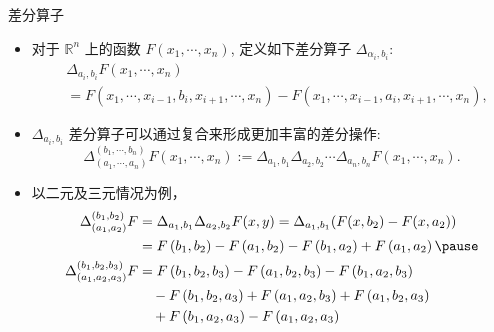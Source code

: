 \documentclass[Prob-All.tex]{subfiles}
\begin{document}
\begin{frame}{差分算子}
\begin{itemize}[<+-|alert@+>]
\item 对于 $\mathbb{R}^{n}$ 上的函数 $F(x_1,\cdots,x_n)$, 定义如下差分算子 $\Delta_{\alpha_{i}, b_{i}}$:
\begin{align*}
   &\Delta_{a_{i}, b_{i}}F(x_{1}, \cdots, x_{n})\\
   &=F\left(x_{1}, \cdots, x_{i-1}, b_{i}, x_{i+1}, \cdots, x_{n}\right)-F\left(x_{1}, \cdots, x_{i-1}, a_{i}, x_{i+1}, \cdots, x_{n}\right),
\end{align*}

\item $\Delta_{a_{i}, b_{i}}$ 差分算子可以通过复合来形成更加丰富的差分操作:
\[
\Delta_{\left(a_{1}, \cdots, a_{n}\right)}^{\left(b_{1}, \cdots, b_{n}\right)}F\left(x_{1}, \cdots, x_{n}\right) :=\Delta_{a_{1}, b_{1}} \Delta_{a_{2}, b_{2}} \cdots \Delta_{a_{n}, b_{n}} F\left(x_{1}, \cdots, x_{n}\right).
\]
\item
以二元及三元情况为例，
\begin{align*}
	\Delta_{\left(a_{1}, a_{2}\right)}^{\left(b_{1}, b_{2}\right)} F&= \Delta_{a_{1}, b_{1}} \Delta_{a_{2}, b_{2}} F(x,y)=\Delta_{a_{1}, b_{1}} (F(x, b_2)-F(x,a_2)) \\
	&=F\left(b_{1}, b_{2}\right)-F\left(a_{1}, b_{2}\right)-F\left(b_{1}, a_{2}\right)+F\left(a_{1}, a_{2}\right) \pause \\
	\Delta_{\left(a_{1}, a_{2}, a_{3}\right)}^{\left(b_{1}, b_{2}, b_{3}\right)} F&= F\left(b_{1}, b_{2}, b_{3}\right)-F\left(a_{1}, b_{2}, b_{3}\right)-F\left(b_{1}, a_{2}, b_{3}\right)\\
	&\quad -F\left(b_{1}, b_{2}, a_{3}\right) +F\left(a_{1}, a_{2}, b_{3}\right)+F\left(a_{1}, b_{2}, a_{3}\right)\\
	&\quad +F\left(b_{1}, a_{2}, a_{3}\right)-F\left(a_{1}, a_{2}, a_{3}\right)
\end{align*}

\end{itemize}

\end{frame}
\end{document}

